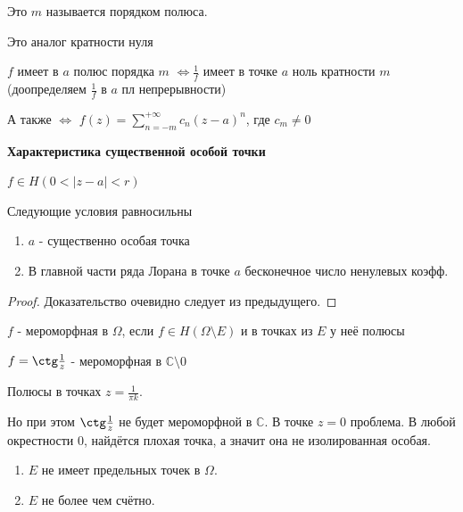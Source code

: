 \begin{definition}
    Это $m$ называется порядком полюса.
    \begin{remark}
        Это аналог кратности нуля
    \end{remark}
\end{definition}

\begin{remark}
    $f$ имеет в $a$ полюс порядка $m$ $\Longleftrightarrow \frac{1}{f}$ имеет в
    точке $a$ ноль кратности $m$ (доопределяем $\frac{1}{f}$ в $a$ пл непрерывности)

    А также $\Longleftrightarrow$ $f(z) = \sum_{n = -m}^{+\infty} c_n (z - a)^n$, где $c_m \neq 0$
\end{remark}

\begin{theorem}
    \textbf{Характеристика существенной особой точки}

    $f \in H(0 < |z - a| < r)$

    Следующие условия равносильны

    \begin{enumerate}
        \item $a$ - существенно особая точка
        \item В главной части ряда Лорана в точке $a$ бесконечное число ненулевых коэфф.
    \end{enumerate}
\end{theorem}

\begin{proof}
    Доказательство очевидно следует из предыдущего.
\end{proof}

\begin{definition}
    $f$ - мероморфная в $\Omega$, если $f \in H(\Omega \setminus E)$ и в точках из $E$ у неё полюсы
\end{definition}

\begin{example}
    $f = \ctg \frac{1}{z}$  - мероморфная в $\mathbb{C} \setminus 0$

    Полюсы в точках $z = \frac{1}{\pi k}$.

    Но при этом $\ctg \frac{1}{z}$ не будет мероморфной в $\mathbb{C}$. В точке $z = 0$ проблема.
    В любой окрестности 0, найдётся плохая точка, а значит она не изолированная особая.
\end{example}

\begin{remark}
    \begin{enumerate}
        \item $E$ не имеет предельных точек в $\Omega$.
        \item $E$ не более чем счётно.
    \end{enumerate}
\end{remark}

